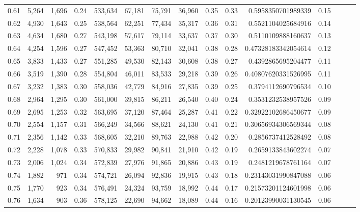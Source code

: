 \begin{tabular}{rrrrrrrrrrrrrrr}
0.61 &   5,264 &  1,696 &  0.24 &  533,634 &   67,181 &   75,791 &   36,960 &  0.35 &  0.33 &    0.5958350701989339 &      0.15 \\
0.62 &   4,930 &  1,643 &  0.25 &  538,564 &   62,251 &   77,434 &   35,317 &  0.36 &  0.31 &    0.5521104025684916 &      0.14 \\
0.63 &   4,634 &  1,680 &  0.27 &  543,198 &   57,617 &   79,114 &   33,637 &  0.37 &  0.30 &    0.5110109888160637 &      0.13 \\
0.64 &   4,254 &  1,596 &  0.27 &  547,452 &   53,363 &   80,710 &   32,041 &  0.38 &  0.28 &   0.47328183342054614 &      0.12 \\
0.65 &   3,833 &  1,433 &  0.27 &  551,285 &   49,530 &   82,143 &   30,608 &  0.38 &  0.27 &    0.4392865695204477 &      0.11 \\
0.66 &   3,519 &  1,390 &  0.28 &  554,804 &   46,011 &   83,533 &   29,218 &  0.39 &  0.26 &   0.40807620331526995 &      0.11 \\
0.67 &   3,232 &  1,383 &  0.30 &  558,036 &   42,779 &   84,916 &   27,835 &  0.39 &  0.25 &    0.3794112690796534 &      0.10 \\
0.68 &   2,964 &  1,295 &  0.30 &  561,000 &   39,815 &   86,211 &   26,540 &  0.40 &  0.24 &    0.3531232538957526 &      0.09 \\
0.69 &   2,695 &  1,253 &  0.32 &  563,695 &   37,120 &   87,464 &   25,287 &  0.41 &  0.22 &   0.32922102686450677 &      0.09 \\
0.70 &   2,554 &  1,157 &  0.31 &  566,249 &   34,566 &   88,621 &   24,130 &  0.41 &  0.21 &   0.30656934306569344 &      0.08 \\
0.71 &   2,356 &  1,142 &  0.33 &  568,605 &   32,210 &   89,763 &   22,988 &  0.42 &  0.20 &    0.2856737412528492 &      0.08 \\
0.72 &   2,228 &  1,078 &  0.33 &  570,833 &   29,982 &   90,841 &   21,910 &  0.42 &  0.19 &    0.2659133843602274 &      0.07 \\
0.73 &   2,006 &  1,024 &  0.34 &  572,839 &   27,976 &   91,865 &   20,886 &  0.43 &  0.19 &    0.2481219678761164 &      0.07 \\
0.74 &   1,882 &    971 &  0.34 &  574,721 &   26,094 &   92,836 &   19,915 &  0.43 &  0.18 &   0.23143031990847088 &      0.06 \\
0.75 &   1,770 &    923 &  0.34 &  576,491 &   24,324 &   93,759 &   18,992 &  0.44 &  0.17 &   0.21573201124601998 &      0.06 \\
0.76 &   1,634 &    903 &  0.36 &  578,125 &   22,690 &   94,662 &   18,089 &  0.44 &  0.16 &   0.20123990031130545 &      0.06 \\

\end{tabular}
